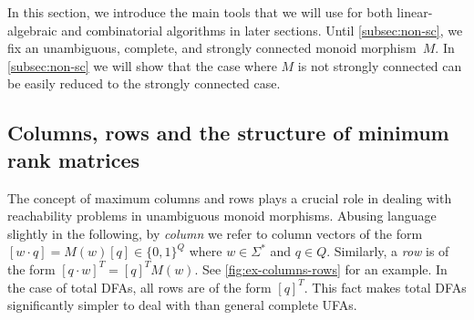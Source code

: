 In this section, we introduce the main tools that we will use for both linear-algebraic and combinatorial algorithms in later sections.
Until \autoref{subsec:non-sc}, we fix an unambiguous, complete, and strongly connected monoid morphism~$M$. In \autoref{subsec:non-sc} we will show that the case where $M$ is not strongly connected can be easily reduced to the strongly connected case.


\subsection{Columns, rows and the structure of minimum rank matrices}\label{subsec:col-row-defs}

The concept of maximum columns and rows plays a crucial role in dealing with reachability problems in unambiguous monoid morphisms. Abusing language slightly in the following, by \emph{column} we refer to column vectors of the form $[w \cdot q] = M(w)[q] \in \{0,1\}^Q$ where $w \in \Sigma^*$ and $q \in Q$.
Similarly, a \emph{row} is of the form $[q \cdot w]^T = [q]^T M(w)$. See \autoref{fig:ex-columns-rows} for an example. In the case of total DFAs, all rows are of the form $[q]^T$. This fact makes total DFAs significantly simpler to deal with than general complete UFAs.

